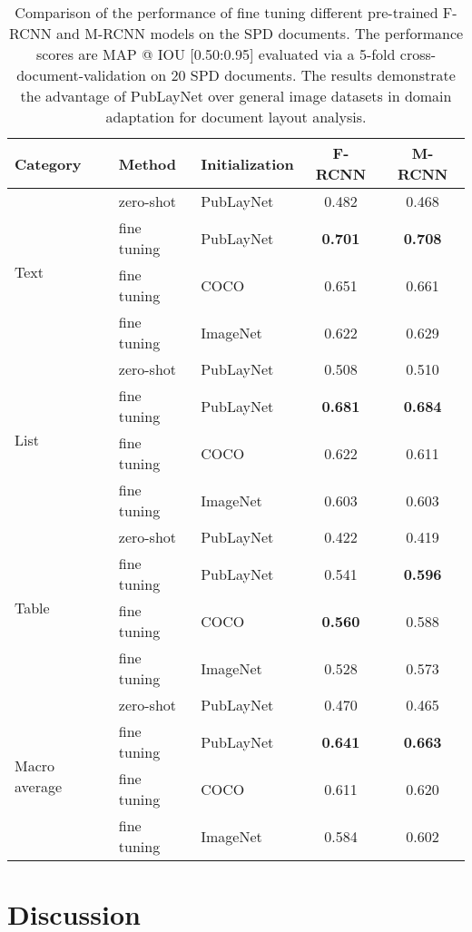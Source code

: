 \documentclass[conference]{IEEEtran}
\begin{document}
\begin{table}[!htb]
  \caption{Comparison of the performance of fine tuning different pre-trained F-RCNN and M-RCNN models on the SPD documents. The performance scores are MAP @ IOU [0.50:0.95] evaluated via a 5-fold cross-document-validation on 20 SPD documents. The results demonstrate the advantage of PubLayNet over general image datasets in domain adaptation for document layout analysis.}
  \label{tab:fine_tuning}
  \centering
  \begin{tabular}{lllcc}
    \toprule
    Category & Method & Initialization & F-RCNN & M-RCNN \\
    \midrule
    \multirow{4}{*}{Text} & zero-shot & PubLayNet & 0.482 & 0.468 \\
    & fine tuning & PubLayNet & \textbf{0.701} & \textbf{0.708} \\
    & fine tuning & COCO & 0.651 & 0.661 \\
    & fine tuning & ImageNet & 0.622 & 0.629 \\
    \midrule
    \multirow{4}{*}{List} & zero-shot & PubLayNet & 0.508 & 0.510 \\
    & fine tuning & PubLayNet & \textbf{0.681} & \textbf{0.684} \\
    & fine tuning & COCO & 0.622 & 0.611 \\
    & fine tuning & ImageNet & 0.603 & 0.603 \\
    \midrule
    \multirow{4}{*}{Table} & zero-shot & PubLayNet & 0.422 & 0.419 \\
    & fine tuning & PubLayNet & 0.541 & \textbf{0.596} \\
    & fine tuning & COCO & \textbf{0.560} & 0.588 \\
    & fine tuning & ImageNet & 0.528 & 0.573 \\
    \midrule
    \multirow{4}{1cm}{Macro average} & zero-shot & PubLayNet & 0.470 & 0.465 \\
    & fine tuning & PubLayNet & \textbf{0.641} & \textbf{0.663} \\
    & fine tuning & COCO & 0.611 & 0.620 \\
    & fine tuning & ImageNet & 0.584 & 0.602 \\
    \bottomrule
\end{tabular}
\end{table}

\section{Discussion}
\end{document}
